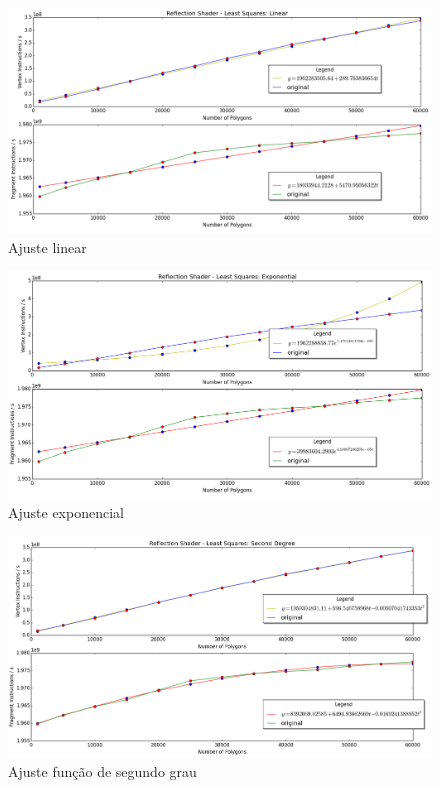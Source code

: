 	\begin{figure}[h]
	\centering
		\includegraphics[keepaspectratio=true,scale=0.4]{figuras/reflectionlinear.png}
	\caption{Ajuste linear}
	\label{linear}
	\end{figure}	

	\begin{figure}[h]
	\centering
		\includegraphics[keepaspectratio=true,scale=0.4]{figuras/reflectionexponential.png}
	\caption{Ajuste exponencial}
	\label{exp}
	\end{figure}	

	\begin{figure}[h]
	\centering
		\includegraphics[keepaspectratio=true,scale=0.4]{figuras/reflectionsec.png}
	\caption{Ajuste função de segundo grau}
	\label{sec}
	\end{figure}	

